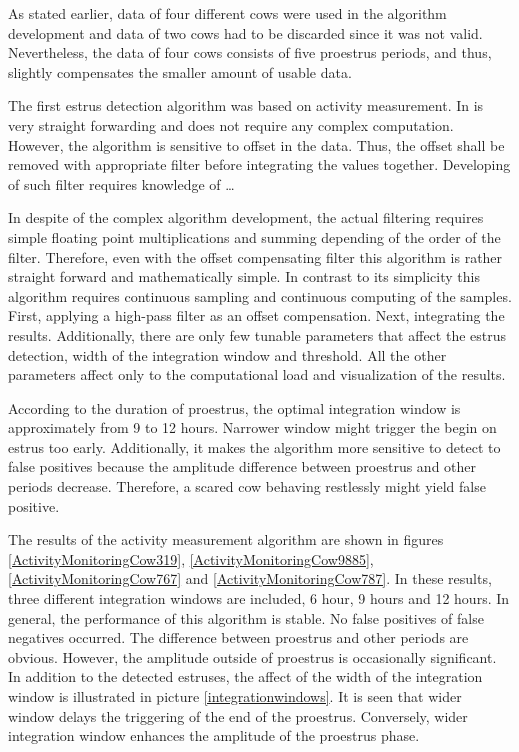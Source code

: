 \documentclass[english,12pt,a4paper,pdftex,elec,utf8]{aaltothesis}
\begin{document}
As stated earlier, data of four different cows were used in the algorithm development and data of two cows had to be discarded since it was not valid. Nevertheless, the data of four cows consists of five proestrus periods, and thus, slightly compensates the smaller amount of usable data.

The first estrus detection algorithm was based on activity measurement. In is very straight forwarding and does not require any complex computation. However, the algorithm is sensitive to offset in the data. Thus, the offset shall be removed with appropriate filter before integrating the values together. Developing of such filter requires knowledge of \dots

In despite of the complex algorithm development, the actual filtering requires simple floating point multiplications and summing depending of the order of the filter. Therefore, even with the offset compensating filter this algorithm is rather straight forward and mathematically simple. In contrast to its simplicity this algorithm requires continuous sampling and continuous computing of the samples. First, applying a high-pass filter as an offset compensation. Next, integrating the results. Additionally, there are only few tunable parameters that affect the estrus detection, width of the integration window and threshold. All the other parameters affect only to the computational load and visualization of the results.

According to the duration of proestrus, the optimal integration window is approximately from 9 to 12 hours. Narrower window might trigger the begin on estrus too early. Additionally, it makes the algorithm more sensitive to detect to false positives because the amplitude difference between proestrus and other periods decrease. Therefore, a scared cow behaving restlessly might yield false positive.

The results of the activity measurement algorithm are shown in figures \ref{ActivityMonitoringCow319}, \ref{ActivityMonitoringCow9885}, \ref{ActivityMonitoringCow767} and \ref{ActivityMonitoringCow787}. In these results, three different integration windows are included, 6 hour, 9 hours and 12 hours. In general, the performance of this algorithm is stable. No false positives of false negatives occurred. The difference between proestrus and other periods are obvious. However, the amplitude outside of proestrus is occasionally significant. In addition to the detected estruses, the affect of the width of the integration window is illustrated in picture \ref{integrationwindows}. It is seen that wider window delays the triggering of the end of the proestrus. Conversely, wider integration window enhances the amplitude of the proestrus phase. 
\end{document}
